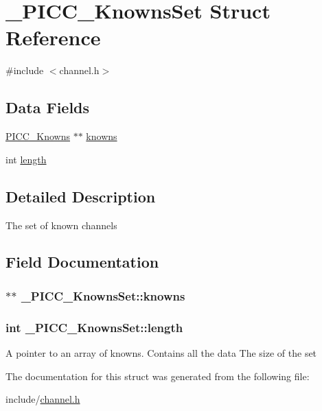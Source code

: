 \hypertarget{struct__PICC__KnownsSet}{\section{\-\_\-\-P\-I\-C\-C\-\_\-\-Knowns\-Set Struct Reference}
\label{struct__PICC__KnownsSet}
}


{\ttfamily \#include $<$channel.\-h$>$}

\subsection*{Data Fields}
{\bf }\par
\begin{DoxyCompactItemize}
\item 
\hyperlink{channel_8h_a87609417467916d98a7505871adc1760}{P\-I\-C\-C\-\_\-\-Knowns} $\ast$$\ast$ \hyperlink{struct__PICC__KnownsSet_ab85d345cd29239294ade04c268ecaa24}{knowns}
\item 
int \hyperlink{struct__PICC__KnownsSet_acf290a610af4272aa762ff721b8622a1}{length}
\end{DoxyCompactItemize}



\subsection{Detailed Description}
The set of known channels 

\subsection{Field Documentation}
\hypertarget{struct__PICC__KnownsSet_ab85d345cd29239294ade04c268ecaa24}{
\subsubsection[{knowns}]{$\ast$$\ast$ \-\_\-\-P\-I\-C\-C\-\_\-\-Knowns\-Set\-::knowns}}\label{struct__PICC__KnownsSet_ab85d345cd29239294ade04c268ecaa24}
\hypertarget{struct__PICC__KnownsSet_acf290a610af4272aa762ff721b8622a1}{
\subsubsection[{length}]{\setlength{\rightskip}{0pt plus 5cm}int \-\_\-\-P\-I\-C\-C\-\_\-\-Knowns\-Set\-::length}}\label{struct__PICC__KnownsSet_acf290a610af4272aa762ff721b8622a1}
A pointer to an array of knowns. Contains all the data The size of the set 

The documentation for this struct was generated from the following file\-:\begin{DoxyCompactItemize}
\item 
include/\hyperlink{channel_8h}{channel.\-h}\end{DoxyCompactItemize}
